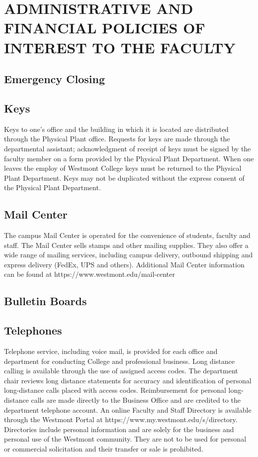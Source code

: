 \section{ADMINISTRATIVE AND FINANCIAL POLICIES OF INTEREST TO THE FACULTY}
	\subsection{Emergency Closing}
	\subsection{Keys}
		Keys to one's office and the building in which it is located are distributed through the Physical Plant office.  Requests for keys are made through the departmental assistant; acknowledgment of receipt of keys must be signed by the faculty member on a form provided by the Physical Plant Department.  When one leaves the employ of Westmont College keys must be returned to the Physical Plant Department.  Keys may not be duplicated without the express consent of the Physical Plant Department.
	\subsection{Mail Center}
		The campus Mail Center is operated for the convenience of students, faculty and staff. The Mail Center sells stamps and other mailing supplies. They also offer a wide range of mailing services, including campus delivery, outbound shipping and express delivery (FedEx, UPS and others).  Additional Mail Center information can be found at https://www.westmont.edu/mail-center
	\subsection{Bulletin Boards}
	\subsection{Telephones}
		Telephone service, including voice mail, is provided for each office and department for conducting College and professional business.  Long distance calling is available through the use of assigned access codes.  The department chair reviews long distance statements for accuracy and identification of personal long-distance calls placed with access codes.  Reimbursement for personal long-distance calls are made directly to the Business Office and are credited to the department telephone account.  An online Faculty and Staff Directory is available through the Westmont Portal at https://www.my.westmont.edu/s/directory.  Directories include personal information and are solely for the business and personal use of the Westmont community.  They are not to be used for personal or commercial solicitation and their transfer or sale is prohibited.
